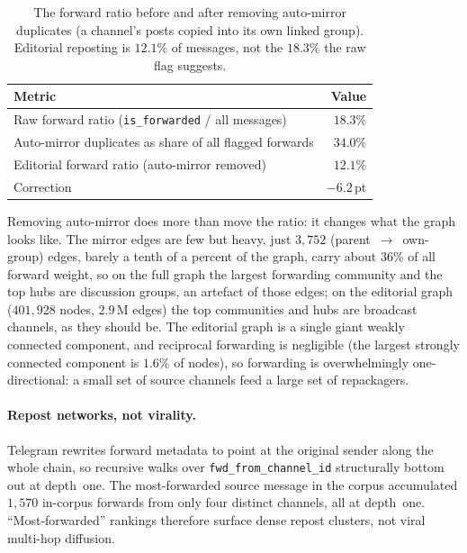 \begin{table}[htbp]
\centering
\caption[Auto-mirror-corrected forward ratio.]{The forward ratio before and after removing auto-mirror duplicates (a channel's posts copied into its own linked group). Editorial reposting is $12.1\%$ of messages, not the $18.3\%$ the raw flag suggests.}
\label{tab:res-fwd-ratio}
\small
\begin{tabular}{@{}lr@{}}
\toprule
\textbf{Metric} & \textbf{Value} \\
\midrule
Raw forward ratio (\texttt{is\_forwarded} / all messages) & $18.3\%$ \\
Auto-mirror duplicates as share of all flagged forwards   & $34.0\%$ \\
Editorial forward ratio (auto-mirror removed)             & $12.1\%$ \\
Correction                                                & $-6.2$\,pt \\
\bottomrule
\end{tabular}
\end{table}

Removing auto-mirror does more than move the ratio: it changes what the graph looks like. The mirror edges are few but heavy, just $3{,}752$ \mbox{(parent~$\rightarrow$~own-group)} edges, barely a tenth of a percent of the graph, carry about $36\%$ of all forward weight, so on the full graph the largest forwarding community and the top hubs are discussion groups, an artefact of those edges; on the editorial graph ($401{,}928$ nodes, $2.9$\,M edges) the top communities and hubs are broadcast channels, as they should be. The editorial graph is a single giant weakly connected component, and reciprocal forwarding is negligible (the largest strongly connected component is $1.6\%$ of nodes), so forwarding is overwhelmingly one-directional: a small set of source channels feed a large set of repackagers.

\paragraph{Repost networks, not virality.}
Telegram rewrites forward metadata to point at the original sender along the whole chain, so recursive walks over \texttt{fwd\_\allowbreak from\_\allowbreak channel\_\allowbreak id} structurally bottom out at depth~one. The most-forwarded source message in the corpus accumulated $1{,}570$ in-corpus forwards from only four distinct channels, all at depth~one. ``Most-forwarded'' rankings therefore surface dense repost clusters, not viral multi-hop diffusion.

